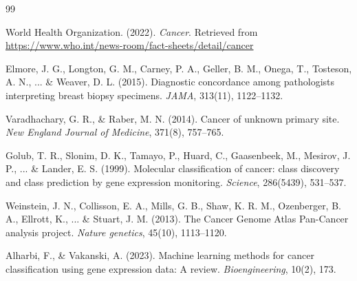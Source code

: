 \documentclass{article}
\begin{document}
\begin{thebibliography}{99}

World Health Organization. (2022). \textit{Cancer}. Retrieved from \url{https://www.who.int/news-room/fact-sheets/detail/cancer}

Elmore, J. G., Longton, G. M., Carney, P. A., Geller, B. M., Onega, T., Tosteson, A. N., ... \& Weaver, D. L. (2015). Diagnostic concordance among pathologists interpreting breast biopsy specimens. \textit{JAMA}, 313(11), 1122--1132.

Varadhachary, G. R., \& Raber, M. N. (2014). Cancer of unknown primary site. \textit{New England Journal of Medicine}, 371(8), 757--765.

Golub, T. R., Slonim, D. K., Tamayo, P., Huard, C., Gaasenbeek, M., Mesirov, J. P., ... \& Lander, E. S. (1999). Molecular classification of cancer: class discovery and class prediction by gene expression monitoring. \textit{Science}, 286(5439), 531--537.

Weinstein, J. N., Collisson, E. A., Mills, G. B., Shaw, K. R. M., Ozenberger, B. A., Ellrott, K., ... \& Stuart, J. M. (2013). The Cancer Genome Atlas Pan-Cancer analysis project. \textit{Nature genetics}, 45(10), 1113--1120.

Alharbi, F., \& Vakanski, A. (2023). Machine learning methods for cancer classification using gene expression data: A review. \textit{Bioengineering}, 10(2), 173.

\end{thebibliography}
\end{document}
